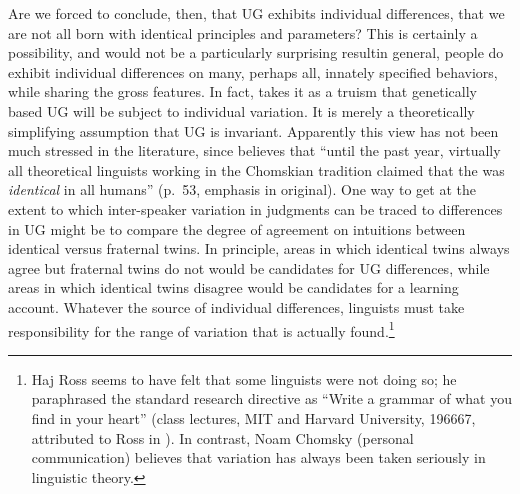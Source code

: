  Are we forced to conclude, then, that UG exhibits individual differences, that we are not all born with identical principles and parameters? This is certainly a possibility, and would not be a particularly surprising result\schdash{}in general, people do exhibit individual differences on many, perhaps all, innately specified behaviors, while sharing the gross features. In fact, \citet{Chomsky1991} takes it as a\label{ChomskyPrefacestart}
 truism that genetically based UG will be subject to individual variation.  It is merely a theoretically simplifying assumption that UG is invariant. Apparently this view has not been much stressed in the literature, since \citet{Lieberman1991} believes that ``until the past year, virtually all theoretical linguists working in the Chomskian tradition claimed that the  was \textit{identical} in all humans'' (p.~53, emphasis in original). One way to get at the extent to which inter-speaker variation in judgments can be traced to differences in UG might be to compare the degree of agreement on intuitions between identical versus fraternal twins. In principle, areas in which identical twins always agree but fraternal twins do not would be candidates for UG differences, while areas in which identical twins disagree would be candidates for a learning account. Whatever the source of individual differences, linguists must take responsibility for the range of variation that is actually found.\footnote{Haj Ross seems to have felt that some linguists were not doing so; he paraphrased the standard research directive as ``Write a grammar of what you find in your heart'' (class lectures, MIT and Harvard University, 1966\textendash{}67, attributed to Ross in \citet{Carden1973}). In contrast, Noam Chomsky (personal communication) believes that variation has always been taken seriously in linguistic theory.}\label{ChomskyPrefaceend}


